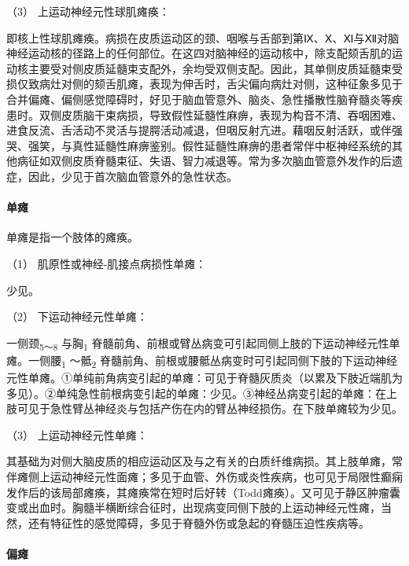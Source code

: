 \hypertarget{text00018.htmlux5cux23CHP1-6-2-3-3-3}{}
（3） 上运动神经元性球肌瘫痪：

即核上性球肌瘫痪。病损在皮质运动区的颈、咽喉与舌部到第Ⅸ、Ⅹ、Ⅺ与Ⅻ对脑神经运动核的径路上的任何部位。在这四对脑神经的运动核中，除支配颏舌肌的运动核主要受对侧皮质延髓束支配外，余均受双侧支配。因此，其单侧皮质延髓束受损仅致病灶对侧的颏舌肌瘫，表现为伸舌时，舌尖偏向病灶对侧，这种征象多见于合并偏瘫、偏侧感觉障碍时，好见于脑血管意外、脑炎、急性播散性脑脊髓炎等疾患时。双侧皮质脑干束病损，导致假性延髓性麻痹，表现为构音不清、吞咽困难、进食反流、舌活动不灵活与提腭活动减退，但咽反射亢进。藉咽反射活跃，或伴强哭、强笑，与真性延髓性麻痹鉴别。假性延髓性麻痹的患者常伴中枢神经系统的其他病征如双侧皮质脊髓束征、失语、智力减退等。常为多次脑血管意外发作的后遗症，因此，少见于首次脑血管意外的急性状态。

\paragraph{单瘫}

单瘫是指一个肢体的瘫痪。

\hypertarget{text00018.htmlux5cux23CHP1-6-2-3-4-1}{}
（1） 肌原性或神经-肌接点病损性单瘫：

少见。

\hypertarget{text00018.htmlux5cux23CHP1-6-2-3-4-2}{}
（2） 下运动神经元性单瘫：

一侧颈\textsubscript{5～8} 与胸\textsubscript{1}
脊髓前角、前根或臂丛病变可引起同侧上肢的下运动神经元性单瘫。一侧腰\textsubscript{1}
～骶\textsubscript{2}
脊髓前角、前根或腰骶丛病变时可引起同侧下肢的下运动神经元性单瘫。①单纯前角病变引起的单瘫：可见于脊髓灰质炎（以累及下肢近端肌为多见）。②单纯急性前根病变引起的单瘫：少见。③神经丛病变引起的单瘫：在上肢可见于急性臂丛神经炎与包括产伤在内的臂丛神经损伤。在下肢单瘫较为少见。

\hypertarget{text00018.htmlux5cux23CHP1-6-2-3-4-3}{}
（3） 上运动神经元性单瘫：

其基础为对侧大脑皮质的相应运动区及与之有关的白质纤维病损。其上肢单瘫，常伴瘫侧上运动神经元性面瘫；多见于血管、外伤或炎性疾病，也可见于局限性癫痫发作后的该局部瘫痪，其瘫痪常在短时后好转（Todd瘫痪）。又可见于静区肿瘤囊变或出血时。胸髓半横断综合征时，出现病变同侧下肢的上运动神经元性瘫，当然，还有特征性的感觉障碍，多见于脊髓外伤或急起的脊髓压迫性疾病等。

\paragraph{偏瘫}

